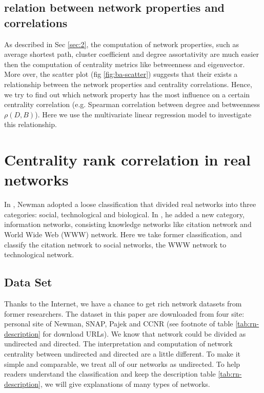 \documentclass[symmetry,article,submit,moreauthors,pdftex,10pt,a4paper]{Definitions/mdpi}
\makeatletter
\newcommand*{\eg}{e.g.\@\xspace}
\makeatother
\begin{document}
\subsection{relation between network properties and correlations}
As described in Sec \ref{sec:2}, the computation of network properties, such as average shortest path, cluster coefficient and degree assortativity are much easier then the computation of centrality metrics like betweenness and eigenvector. More over, the scatter plot (fig \ref{fig:ba-scatter}) suggests that their exists a relationship between the network properties and centrality correlations. Hence, we try to find out which network property has the most influence on a certain centrality correlation (\eg Spearman correlation between degree and betweenness $\rho(D,B)$). Here we use the multivariate linear regression model to investigate this relationship.











\section{Centrality rank correlation in real networks}
\label{sec:rn}
In \cite{newman2003mixing}, Newman adopted a loose classification that divided real networks into three categories: social, technological and biological. In \cite{Nej2003The}, he added a new category, information networks, consisting knowledge networks like citation network and World Wide Web (WWW) network. Here we take former classification, and classify the citation network to social networks, the WWW network to technological network.
\subsection{Data Set}
\label{sec:rn-datasets}
Thanks to the Internet, we have a chance to get rich network datasets from former researchers. The dataset in this paper are downloaded from four site: personal site of Newman, SNAP, Pajek and CCNR (see footnote of table \ref{tab:rn-description} for download URLs). We know that network could be divided as undirected and directed. The interpretation and computation of network centrality between undirected and directed are a little different. To make it simple and comparable, we treat all of our networks as undirected.    To help readers understand the classification and keep the description table \ref{tab:rn-description}, we will give explanations of many types of networks.
\end{document}
